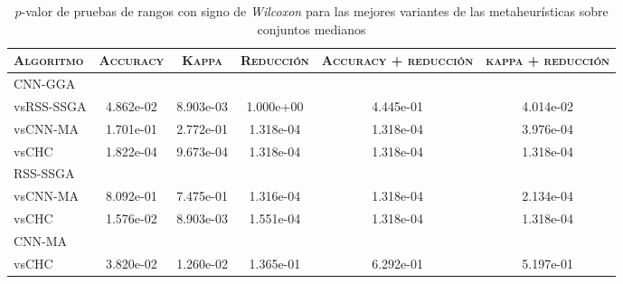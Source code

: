\begin{table}[h!]
\centering
\begin{adjustbox}{max width =\textwidth}
\begin{tabular}{l c c c c c}
\hline
	\textsc{Algoritmo}
	& \multicolumn{1}{c}{\textsc{Accuracy}}
	& \multicolumn{1}{c}{\textsc{Kappa}}
	& \multicolumn{1}{c}{\textsc{Reducción}} 
	& \multicolumn{1}{c}{\textsc{Accuracy + reducción}} 
	& \multicolumn{1}{c}{\textsc{kappa + reducción}} \\

\hline
\hline

CNN-GGA\\
vsRSS-SSGA & 4.862e-02 & 8.903e-03 & 1.000e+00 & 4.445e-01 & 4.014e-02 \\ 
vsCNN-MA  & 1.701e-01 & 2.772e-01 & 1.318e-04 & 1.318e-04 & 3.976e-04 \\
vsCHC     & 1.822e-04 & 9.673e-04 & 1.318e-04 & 1.318e-04 & 1.318e-04 \\

\hline

RSS-SSGA\\
vsCNN-MA & 8.092e-01 & 7.475e-01 & 1.316e-04 & 1.318e-04 & 2.134e-04 \\
vsCHC    & 1.576e-02 & 8.903e-03 & 1.551e-04 & 1.318e-04 & 1.318e-04 \\

\hline

CNN-MA\\
vsCHC & 3.820e-02 & 1.260e-02 & 1.365e-01 & 6.292e-01 & 5.197e-01 \\

\hline

\end{tabular}
\end{adjustbox}
\caption[Pruebas de \emph{Wilcoxon} entre las mejores variaciones de cada metaheurística para conjuntos medianos]{$p$-valor de pruebas de rangos con signo de \emph{Wilcoxon} para las mejores variantes de las metaheurísticas sobre conjuntos medianos}
\label{wilcox-best-med}
\end{table}